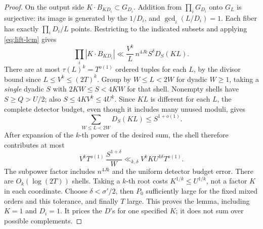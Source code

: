 \begin{proof}
On the output side \(K\cdot B_{KD_i}\subset G_{D_i}\).
Addition from \(\prod_i G_{D_i}\) onto \(G_L\) is surjective:
its image is generated by the \(1/D_i\), and
\(\gcd_i(L/D_i)=1\). Each fiber has exactly \(\prod_i D_i/L\)
points. Restricting to the indicated subsets and applying
\eqref{eq:lift-lcm} gives
\[
 \prod_i |K\cdot B_{KD_i}|
       \ll \frac{V^k}{L}\,n^{4Jk} S^\delta D_S(KL).
\]
There are at most \(\tau(L)^k=T^{o(1)}\) ordered tuples for each
\(L\), by the divisor bound since \(L\le V^k\le(2T)^k\).
Group by \(W\le L<2W\) for dyadic \(W\ge1\), taking a \emph{single}
dyadic \(S\) with \(2KW\le S<4KW\) for that shell. Nonempty shells
have \(S\ge Q>U/2\); also \(S\le 4 K V^k\le 4U^k\). Since \(KL\)
is different for each \(L\), the complete detector budget, even
though it includes many unused moduli, gives
\[
 \sum_{W\le L<2W}D_S(KL)\le S^{1+o(1)}.
\]
After expansion of the \(k\)-th power of the desired sum, the shell
therefore contributes at most
\[
 V^k T^{o(1)}\,\frac{S^{1+\delta}}{W}
   \ll_{k,\delta} V^k K U^{k\delta} T^{o(1)} .
\]
The subpower factor includes \(n^{4Jk}\) and the uniform detector
budget error. There are \(O_k(\log(2T))\) shells. Taking a \(k\)-th
root costs \(K^{1/k}\le U^{1/k}\), not a factor \(K\) in each
coordinate. Choose \(\delta<\sigma'/2\), then \(P_0\) sufficiently
large for the fixed mixed orders and this tolerance, and finally
\(T\) large. This proves the lemma, including \(K=1\) and
\(D_i=1\). It prices the \(D\)'s for one specified \(K\); it does
not sum over possible complements.
\end{proof}

